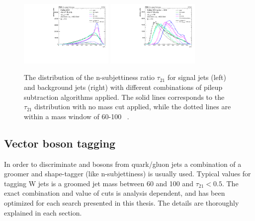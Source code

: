 \begin{figure}[h!] 
    \centering 
    \includegraphics[width=0.40\textwidth]{figures/event_reconstruction/sig_tau21.pdf}
    \includegraphics[width=0.40\textwidth]{figures/event_reconstruction/bkg_tau21.pdf}
     \caption{The distribution of the n-subjettiness ratio $\tau_{21}$ for signal jets (left) and background jets (right) with different combinations of pileup subtraction algorithms applied. The solid lines corresponds to the $\tau_{21}$ distribution with no mass cut applied, while the dotted lines are within a mass window of 60-100 \GeV~\cite{CMS-PAS-JME-14-001}.}
     \label{fig:objreco:tau21}
 \end{figure}

\subsection{Vector boson tagging}
In order to discriminate \PW and \PZ bosons from quark/gluon jets a combination of a groomer and shape-tagger (like n-subjettiness) is usually used.
Typical values for tagging W jets is a groomed jet mass between 60 and 100 \GeV and $\tau_{21}<0.5$. The exact combination and value of cuts is analysis dependent, and has been optimized for each search presented in this thesis. The details are thoroughly explained in each section.


